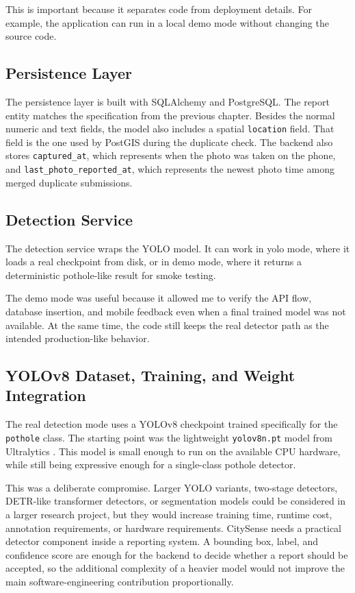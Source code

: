 This is important because it separates code from deployment details. For example, the application can run in a local demo mode without changing the source code.

\subsection{Persistence Layer}

The persistence layer is built with SQLAlchemy and PostgreSQL. The report entity matches the specification from the previous chapter. Besides the normal numeric and text fields, the model also includes a spatial \texttt{location} field. That field is the one used by PostGIS during the duplicate check. The backend also stores \texttt{captured\_\allowbreak at}, which represents when the photo was taken on the phone, and \texttt{last\_\allowbreak photo\_\allowbreak reported\_\allowbreak at}, which represents the newest photo time among merged duplicate submissions.

\subsection{Detection Service}

The detection service wraps the YOLO model. It can work in yolo mode, where it loads a real checkpoint from disk, or in demo mode, where it returns a deterministic pothole-like result for smoke testing.

The demo mode was useful because it allowed me to verify the API flow, database insertion, and mobile feedback even when a final trained model was not available. At the same time, the code still keeps the real detector path as the intended production-like behavior.

\subsection{YOLOv8 Dataset, Training, and Weight Integration}

The real detection mode uses a YOLOv8 checkpoint trained specifically for the \texttt{pothole} class. The starting point was the lightweight \texttt{yolov8n.pt} model from Ultralytics \cite{jocher2023ultralytics}. This model is small enough to run on the available CPU hardware, while still being expressive enough for a single-class pothole detector.

This was a deliberate compromise. Larger YOLO variants, two-stage detectors, DETR-like transformer detectors, or segmentation models could be considered in a larger research project, but they would increase training time, runtime cost, annotation requirements, or hardware requirements. CitySense needs a practical detector component inside a reporting system. A bounding box, label, and confidence score are enough for the backend to decide whether a report should be accepted, so the additional complexity of a heavier model would not improve the main software-engineering contribution proportionally.

